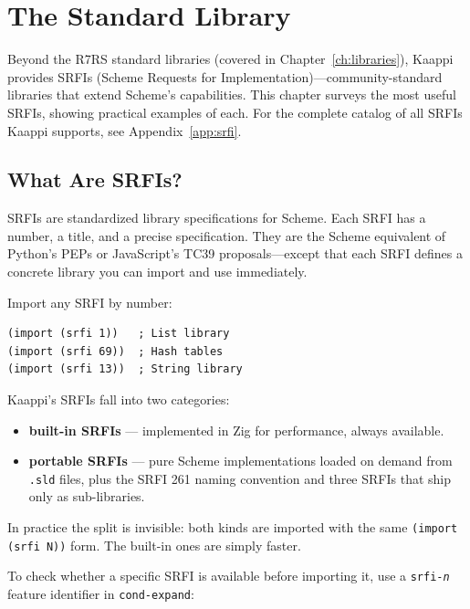 \chapter{The Standard Library}
\label{ch:stdlib}

Beyond the R7RS standard libraries (covered in Chapter~\ref{ch:libraries}), Kaappi provides \srfitotal{} SRFIs (Scheme Requests for Implementation)---community-standard libraries that extend Scheme's capabilities. This chapter surveys the most useful SRFIs, showing practical examples of each. For the complete catalog of all \srfitotal{} SRFIs Kaappi supports, see Appendix~\ref{app:srfi}.

\section{What Are SRFIs?}

SRFIs are standardized library specifications for Scheme. Each SRFI has a number, a title, and a precise specification. They are the Scheme equivalent of Python's PEPs or JavaScript's TC39 proposals---except that each SRFI defines a concrete library you can import and use immediately.

Import any SRFI by number:

\begin{lstlisting}
(import (srfi 1))   ; List library
(import (srfi 69))  ; Hash tables
(import (srfi 13))  ; String library
\end{lstlisting}

Kaappi's \srfitotal{} SRFIs fall into two categories:

\begin{itemize}
    \item \textbf{\srfibuiltin{} built-in SRFIs} --- implemented in Zig for performance, always available.
    \item \textbf{\srfiportable{} portable SRFIs} --- pure Scheme implementations loaded on demand from \texttt{.sld} files, plus the SRFI 261 naming convention and three SRFIs that ship only as sub-libraries.
\end{itemize}

In practice the split is invisible: both kinds are imported with the same \texttt{(import (srfi N))} form. The built-in ones are simply faster.

To check whether a specific SRFI is available before importing it, use a \texttt{srfi-\emph{n}} feature identifier in \texttt{cond-expand}:

